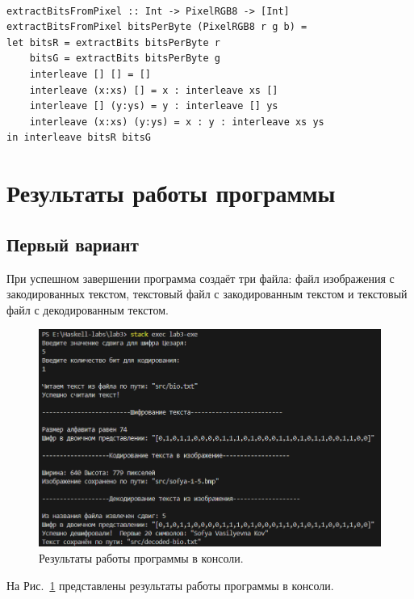 \documentclass[11pt,a4paper,final]{article} %
\begin{document}
\begin{lstlisting}[caption={Функции для чтения зашифрованных данных из изображения (второй вариант).}, label={lst:readImg2}]

extractBitsFromPixel :: Int -> PixelRGB8 -> [Int]
extractBitsFromPixel bitsPerByte (PixelRGB8 r g b) =
let bitsR = extractBits bitsPerByte r
    bitsG = extractBits bitsPerByte g
    interleave [] [] = []
    interleave (x:xs) [] = x : interleave xs []
    interleave [] (y:ys) = y : interleave [] ys
    interleave (x:xs) (y:ys) = x : y : interleave xs ys
in interleave bitsR bitsG
\end{lstlisting}




 \newpage
\section {Результаты работы программы}
\subsection{Первый вариант}
При успешном завершении программа создаёт три файла: файл изображения с закодированных текстом, текстовый файл с закодированным текстом и текстовый файл с декодированным текстом.

\begin{figure}[h]
	\centering
	\includegraphics[width=0.85\linewidth]{img/results.png}
	\caption{Результаты работы программы в консоли.}
	\label{fig:results}
\end{figure}

На Рис.~\ref{fig:results} представлены результаты работы программы в консоли.
\end{document}
